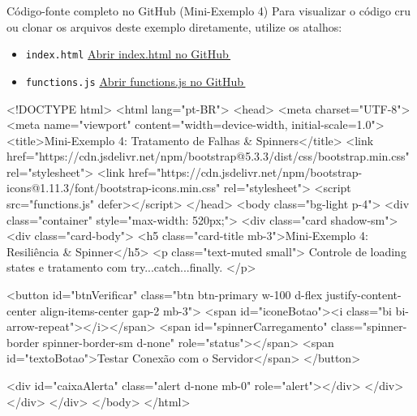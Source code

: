 \begin{repositorio}{Código-fonte completo no GitHub (Mini-Exemplo 4)}
Para visualizar o código cru ou clonar os arquivos deste exemplo diretamente, utilize os atalhos:
\begin{itemize}[nosep]
  \item \texttt{index.html} \seta \href{https://github.com/chameoandre/CST-Sistemas-para-internet-programacao-para-internet-2/blob/main/roteiro-5/mini-exemplos/04-fetch-spinner/index.html}{Abrir index.html no GitHub\,{\scriptsize\faExternalLinkAlt}}
  \item \texttt{functions.js} \seta \href{https://github.com/chameoandre/CST-Sistemas-para-internet-programacao-para-internet-2/blob/main/roteiro-5/mini-exemplos/04-fetch-spinner/functions.js}{Abrir functions.js no GitHub\,{\scriptsize\faExternalLinkAlt}}
\end{itemize}
\end{repositorio}

\begin{boxCodigoHTML}
<!DOCTYPE html>
<html lang="pt-BR">
<head>
  <meta charset="UTF-8">
  <meta name="viewport" content="width=device-width, initial-scale=1.0">
  <title>Mini-Exemplo 4: Tratamento de Falhas & Spinners</title>
  <link
    href="https://cdn.jsdelivr.net/npm/bootstrap@5.3.3/dist/css/bootstrap.min.css"
    rel="stylesheet">
  <link
    href="https://cdn.jsdelivr.net/npm/bootstrap-icons@1.11.3/font/bootstrap-icons.min.css"
    rel="stylesheet">
  <script src="functions.js" defer></script>
</head>
<body class="bg-light p-4">
  <div class="container" style="max-width: 520px;">
    <div class="card shadow-sm">
      <div class="card-body">
        <h5 class="card-title mb-3">Mini-Exemplo 4: Resiliência & Spinner</h5>
        <p class="text-muted small">
          Controle de loading states e tratamento com try...catch...finally.
        </p>

        <button
          id="btnVerificar"
          class="btn btn-primary w-100 d-flex justify-content-center align-items-center gap-2 mb-3">
          <span id="iconeBotao"><i class="bi bi-arrow-repeat"></i></span>
          <span
            id="spinnerCarregamento"
            class="spinner-border spinner-border-sm d-none"
            role="status"></span>
          <span id="textoBotao">Testar Conexão com o Servidor</span>
        </button>

        <div id="caixaAlerta" class="alert d-none mb-0" role="alert"></div>
      </div>
    </div>
  </div>
</body>
</html>
\end{boxCodigoHTML}

